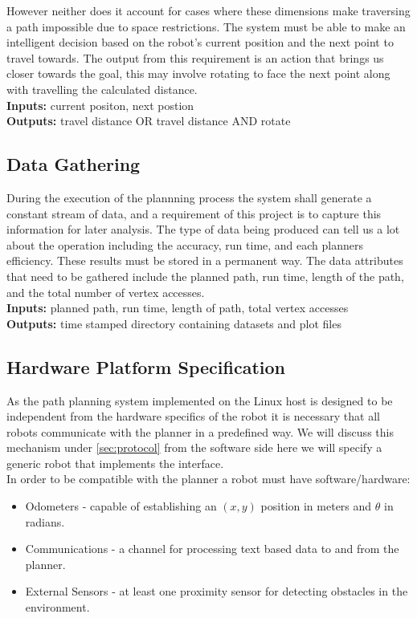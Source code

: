 \noindent
However neither does it account for cases where these dimensions make traversing a path impossible due to space restrictions. The system must be able to make an intelligent decision based on the robot's current position and the next point to travel towards. The output from this requirement is an action that brings us closer towards the goal, this may involve rotating to face the next point along with travelling the calculated distance. \\

\noindent
\textbf{Inputs:} current positon, next postion \\
\textbf{Outputs:} travel distance OR travel distance AND rotate

\subsection{Data Gathering}
\noindent
During the execution of the plannning process the system shall generate a constant stream of data, and a requirement
of this project is to capture this information for later analysis. The type of data being produced can tell us a lot
about the operation including the accuracy, run time, and each planners efficiency. These results must be stored in a permanent way. The data attributes that need to be gathered include the planned path, run time, length of the path, and the total number of vertex accesses. \\

\noindent
\textbf{Inputs:} planned path, run time, length of path, total vertex accesses \\
\textbf{Outputs:} time stamped directory containing datasets and plot files

\subsection{Hardware Platform Specification}
\noindent
As the path planning system implemented on the Linux host is designed to be independent from the hardware specifics of the robot it is necessary that all robots communicate with the planner in a predefined way. We will discuss this mechanism under \ref{sec:protocol} from the software side here we will specify a generic robot that implements the interface. \\

\noindent
In order to be compatible with the planner a robot must have software/hardware:

\begin{itemize}
\item Odometers - capable of establishing an $(x, y)$ position in meters and $\theta$ in radians.
\item Communications - a channel for processing text based data to and from the planner.
\item External Sensors - at least one proximity sensor for detecting obstacles in the environment.
\end{itemize}

